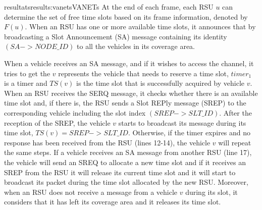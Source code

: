 \documentclass{ra2016}
\begin{document}
\begin{module}{resultats}{results:vanets}{VANETs}
At the end of each frame, each RSU $u$ can determine the set of 
free time slots based on its frame information, denoted by $F(u)$. 
When an RSU has one or more available time slots, it announces that 
by broadcasting a Slot Announcement (SA) message containing its 
identity $(SA->NODE\_ID)$ to all the vehicles in its coverage area. 





%

When a vehicle receives 
an SA message, and if it wishes to access the channel, it tries to get the 
 $v$ represents the vehicle that needs to reserve a 
time slot, $timer_1$ is a timer and $TS(v)$ is the time slot that is successfully 
acquired by vehicle $v$. When an RSU receives the SERQ message, it checks 
whether there is an available time slot and, if there is, the RSU sends a Slot REPly 
message (SREP) to the corresponding vehicle including the slot index $(SREP->SLT\_ID)$. 
After the reception of the SREP, the vehicle $v$ starts to broadcast its message 
during its time slot, $TS(v)=SREP->SLT\_ID$. Otherwise, if the timer expires and 
no response has been received from the RSU (lines 12-14), the vehicle $v$ will repeat the same steps.
If a vehicle receives an SA message from another RSU (line 17), the vehicle 
will send an SREQ to allocate a new time slot and if it receives an SREP from 
the RSU it will release its current time slot and it will start to broadcast its packet 
during the time slot allocated by the new RSU. Moreover, when an RSU does 
not receive a message from a vehicle $v$ during its slot, it considers that it has 
left its coverage area and it releases its time slot. 


\end{module}
\end{document}

